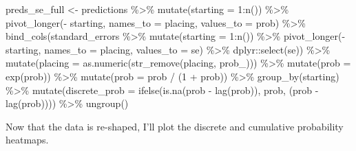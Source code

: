 \documentclass[
]{book}
\newenvironment{Shaded}{\begin{snugshade}}{\end{snugshade}}
\newcommand{\AttributeTok}[1]{\textcolor[rgb]{0.77,0.63,0.00}{#1}}
\newcommand{\DecValTok}[1]{\textcolor[rgb]{0.00,0.00,0.81}{#1}}
\newcommand{\FunctionTok}[1]{\textcolor[rgb]{0.00,0.00,0.00}{#1}}
\newcommand{\NormalTok}[1]{#1}
\newcommand{\OtherTok}[1]{\textcolor[rgb]{0.56,0.35,0.01}{#1}}
\newcommand{\SpecialCharTok}[1]{\textcolor[rgb]{0.00,0.00,0.00}{#1}}
\newcommand{\StringTok}[1]{\textcolor[rgb]{0.31,0.60,0.02}{#1}}
\begin{document}
\begin{Shaded}
\begin{Highlighting}[]
\NormalTok{preds\_se\_full }\OtherTok{\textless{}{-}}\NormalTok{ predictions }\SpecialCharTok{\%\textgreater{}\%}
  \FunctionTok{mutate}\NormalTok{(}\AttributeTok{starting =} \DecValTok{1}\SpecialCharTok{:}\FunctionTok{n}\NormalTok{()) }\SpecialCharTok{\%\textgreater{}\%}
  \FunctionTok{pivot\_longer}\NormalTok{(}\SpecialCharTok{{-}}\NormalTok{ starting, }\AttributeTok{names\_to =} \StringTok{\textquotesingle{}placing\textquotesingle{}}\NormalTok{, }\AttributeTok{values\_to =} \StringTok{\textquotesingle{}prob\textquotesingle{}}\NormalTok{) }\SpecialCharTok{\%\textgreater{}\%} 
  \FunctionTok{bind\_cols}\NormalTok{(standard\_errors }\SpecialCharTok{\%\textgreater{}\%} \FunctionTok{mutate}\NormalTok{(}\AttributeTok{starting =} \DecValTok{1}\SpecialCharTok{:}\FunctionTok{n}\NormalTok{()) }\SpecialCharTok{\%\textgreater{}\%}
  \FunctionTok{pivot\_longer}\NormalTok{(}\SpecialCharTok{{-}}\NormalTok{ starting, }\AttributeTok{names\_to =} \StringTok{\textquotesingle{}placing\textquotesingle{}}\NormalTok{, }\AttributeTok{values\_to =} \StringTok{\textquotesingle{}se\textquotesingle{}}\NormalTok{) }\SpecialCharTok{\%\textgreater{}\%}
\NormalTok{    dplyr}\SpecialCharTok{::}\FunctionTok{select}\NormalTok{(se)) }\SpecialCharTok{\%\textgreater{}\%}
  \FunctionTok{mutate}\NormalTok{(}\AttributeTok{placing =} \FunctionTok{as.numeric}\NormalTok{(}\FunctionTok{str\_remove}\NormalTok{(placing, }\StringTok{\textquotesingle{}prob\_\textquotesingle{}}\NormalTok{))) }\SpecialCharTok{\%\textgreater{}\%}
  \FunctionTok{mutate}\NormalTok{(}\AttributeTok{prob =} \FunctionTok{exp}\NormalTok{(prob)) }\SpecialCharTok{\%\textgreater{}\%}
  \FunctionTok{mutate}\NormalTok{(}\AttributeTok{prob =}\NormalTok{ prob }\SpecialCharTok{/}\NormalTok{ (}\DecValTok{1} \SpecialCharTok{+}\NormalTok{ prob)) }\SpecialCharTok{\%\textgreater{}\%}
  \FunctionTok{group\_by}\NormalTok{(starting) }\SpecialCharTok{\%\textgreater{}\%} 
  \FunctionTok{mutate}\NormalTok{(}\AttributeTok{discrete\_prob =} \FunctionTok{ifelse}\NormalTok{(}\FunctionTok{is.na}\NormalTok{(prob }\SpecialCharTok{{-}} \FunctionTok{lag}\NormalTok{(prob)), prob, (prob }\SpecialCharTok{{-}} \FunctionTok{lag}\NormalTok{(prob)))) }\SpecialCharTok{\%\textgreater{}\%}
  \FunctionTok{ungroup}\NormalTok{()}
\end{Highlighting}
\end{Shaded}

Now that the data is re-shaped, I'll plot the discrete and cumulative probability heatmaps.
\end{document}
